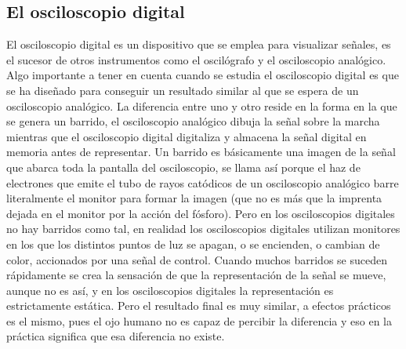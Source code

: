 \subsection{El osciloscopio digital}\label{subsec:digosc}

El osciloscopio digital es un dispositivo que se emplea para visualizar
señales, es el sucesor de otros instrumentos como el oscilógrafo y el
osciloscopio analógico. Algo importante a tener en cuenta cuando se estudia
el osciloscopio digital es que se ha diseñado para conseguir un resultado
similar al que se espera de un osciloscopio analógico. La diferencia entre
uno y otro reside en la forma en la que se genera un barrido, el
osciloscopio analógico dibuja la señal sobre la marcha mientras que el
osciloscopio digital digitaliza y almacena la señal digital en memoria
antes de representar. Un barrido es básicamente una imagen de la señal que
abarca toda la pantalla del osciloscopio, se llama así porque el haz de
electrones que emite el tubo de rayos catódicos de un osciloscopio
analógico barre literalmente el monitor para formar la imagen (que no es
más que la imprenta dejada en el monitor por la acción del fósforo). Pero
en los osciloscopios digitales no hay barridos como tal, en realidad los
osciloscopios digitales utilizan monitores  en los que los
distintos puntos de luz se apagan, o se encienden, o cambian de color,
accionados por una señal de control. Cuando muchos barridos se suceden
rápidamente se crea la sensación de que la representación de la señal se
mueve, aunque no es así, y en los osciloscopios digitales la representación
es estrictamente estática. Pero el resultado final es muy similar, a
efectos prácticos es el mismo, pues el ojo humano no es capaz de percibir
la diferencia y eso en la práctica significa que esa diferencia no existe.

